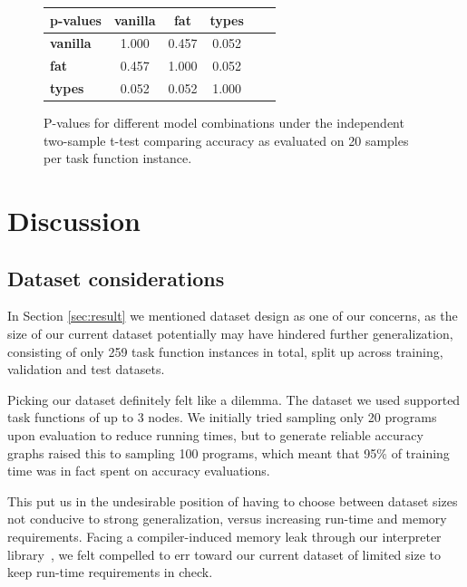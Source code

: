 \documentclass{article}
\begin{document}
\begin{figure}
    \begin{tabular}{|l|c|c|c|c|c|} \hline
        \textbf{p-values}
        & \textbf{vanilla} & \textbf{fat} & \textbf{types} \\ \hline
        \textbf{vanilla} & 1.000 & 0.457 & 0.052 \\ \hline
        \textbf{fat} & 0.457 & 1.000 & 0.052 \\ \hline
        \textbf{types} & 0.052 & 0.052 & 1.000 \\ \hline
    \end{tabular}
    \caption{P-values for different model combinations under the independent two-sample t-test comparing accuracy as evaluated on 20 samples per task function instance.}
    \label{fig:ttest}
\end{figure}


\section{Discussion} %


\subsection{Dataset considerations}

In Section \ref{sec:result} we mentioned dataset design as one of our concerns,
as the size of our current dataset potentially may have hindered further generalization,
consisting of only 259 task function instances in total,
split up across training, validation and test datasets.

Picking our dataset definitely felt like a dilemma.
The dataset we used supported task functions of up to 3 nodes.
We initially tried sampling only 20 programs upon evaluation to reduce running times,
but to generate reliable accuracy graphs raised this to sampling 100 programs,
which meant that 95\% of training time was in fact spent on accuracy evaluations.

This put us in the undesirable position of having to choose
between dataset sizes not conducive to strong generalization,
versus increasing run-time and memory requirements.
Facing a compiler-induced memory leak through our interpreter library~\citep{hintleak},
we felt compelled to err toward our current dataset of
limited size to keep run-time requirements in check.
\end{document}
